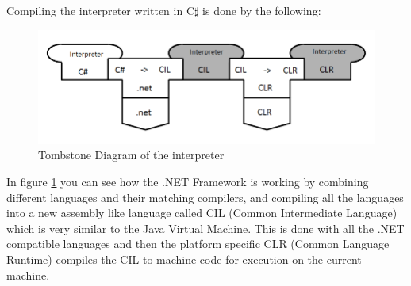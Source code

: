 Compiling the interpreter written in C$\sharp$ is done by the following:

			\begin{figure}[H]
				\centering
				\includegraphics[scale=0.75]{rapport/3/figures/tombstone_of_the_interpreter}
				\caption{Tombstone Diagram of the interpreter} \label{fig:tombstone_of_interpreter}
			\end{figure}

In figure \ref{fig:tombstone_of_interpreter} you can see how the .NET Framework is working by combining different languages and their matching compilers, and compiling all the languages into a new assembly like language called CIL (Common Intermediate Language) \cite{CIL} which is very similar to the Java Virtual Machine. This is done with all the .NET compatible languages and then the platform specific CLR (Common Language Runtime) compiles the CIL to machine code for execution on the current machine.